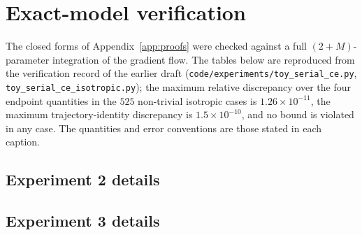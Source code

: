 \section{Exact-model verification}
\label{app:verification}

The closed forms of Appendix~\ref{app:proofs} were checked against a full
$(2+M)$-parameter integration of the gradient flow. The tables below are
reproduced from the verification record of the earlier draft
(\texttt{code/experiments/toy\_serial\_ce.py},
\texttt{toy\_serial\_ce\_isotropic.py}); the maximum relative discrepancy over
the four endpoint quantities in the $525$ non-trivial isotropic cases is
$1.26\times10^{-11}$, the maximum trajectory-identity discrepancy is
$1.5\times10^{-10}$, and no bound is violated in any case. The quantities and
error conventions are those stated in each caption.

\begingroup
\let\section\subsection
\let\subsection\subsubsection

\endgroup

\section{Experiment 2 details}
\label{app:exp2}

\section{Experiment 3 details}
\label{app:exp3}

